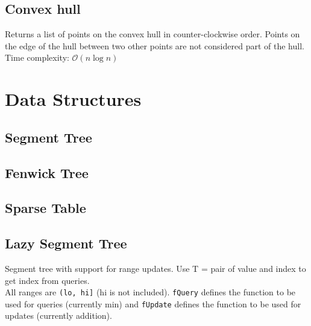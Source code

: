 \documentclass{article}
\begin{document}
\subsection*{Convex hull}
Returns a list of points on the convex hull in counter-clockwise order.
Points on the edge of the hull between two other points are not considered part of the hull.
Time complexity: $\mathcal{O}(n \log n)$
\begin{multicols}{2}
  
  \columnbreak
  
\end{multicols}

\section*{Data Structures}

\subsection*{Segment Tree}
\begin{multicols}{2}
  
  \columnbreak
  
\end{multicols}

\subsection*{Fenwick Tree}


\subsection*{Sparse Table}


\subsection*{Lazy Segment Tree}
Segment tree with support for range updates. Use T = pair of value and index to get index from queries.\\
All ranges are \lstinline{(lo, hi]} (hi is not included).
\lstinline{fQuery} defines the function to be used for queries (currently min) and 
\lstinline{fUpdate} defines the function to be used for updates (currently addition).

\end{document}
